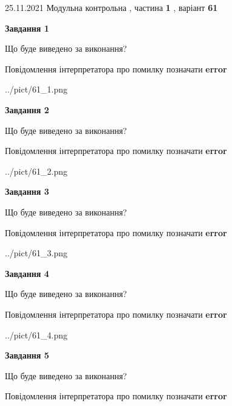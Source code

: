 \documentclass[10pt, ukrainian]{article}
\begin{document}
{25.11.2021 Модульна контрольна , частина \textbf { 1 }, варіант  \No \textbf { 61 }\par}
{
\begin {large}

{\begin {center}\textbf{Завдання 1}\end {center}}\par
Що буде виведено за виконання? \par
Повідомлення інтерпретатора про помилку позначати \textbf{error}

\begin{center}
	{../pict/61_1.png}
\end{center}
\newpage

{\begin {center}\textbf{Завдання 2}\end {center}}\par
Що буде виведено за виконання? \par
Повідомлення інтерпретатора про помилку позначати \textbf{error}

\begin{center}
	{../pict/61_2.png}
\end{center}
\newpage

{\begin {center}\textbf{Завдання 3}\end {center}}\par
Що буде виведено за виконання? \par
Повідомлення інтерпретатора про помилку позначати \textbf{error}

\begin{center}
	{../pict/61_3.png}
\end{center}
\newpage

{\begin {center}\textbf{Завдання 4}\end {center}}\par
Що буде виведено за виконання? \par
Повідомлення інтерпретатора про помилку позначати \textbf{error}

\begin{center}
	{../pict/61_4.png}
\end{center}
\newpage

{\begin {center}\textbf{Завдання 5}\end {center}}\par
Що буде виведено за виконання? \par
Повідомлення інтерпретатора про помилку позначати \textbf{error}


\end{large}}
\end{document}
